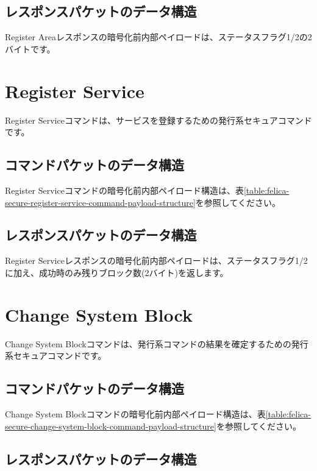 \documentclass[a4paper]{report}
\begin{document}
\subsection{レスポンスパケットのデータ構造}

Register Areaレスポンスの暗号化前内部ペイロードは、ステータスフラグ1/2の2バイトです。

\section{Register Service}

Register Serviceコマンドは、サービスを登録するための発行系セキュアコマンドです。

\subsection{コマンドパケットのデータ構造}

Register Serviceコマンドの暗号化前内部ペイロード構造は、表\ref{table:felica-secure-register-service-command-payload-structure}を参照してください。

\subsection{レスポンスパケットのデータ構造}

Register Serviceレスポンスの暗号化前内部ペイロードは、ステータスフラグ1/2に加え、成功時のみ残りブロック数(2バイト)を返します。

\section{Change System Block}

Change System Blockコマンドは、発行系コマンドの結果を確定するための発行系セキュアコマンドです。

\subsection{コマンドパケットのデータ構造}

Change System Blockコマンドの暗号化前内部ペイロード構造は、表\ref{table:felica-secure-change-system-block-command-payload-structure}を参照してください。

\subsection{レスポンスパケットのデータ構造}
\end{document}
